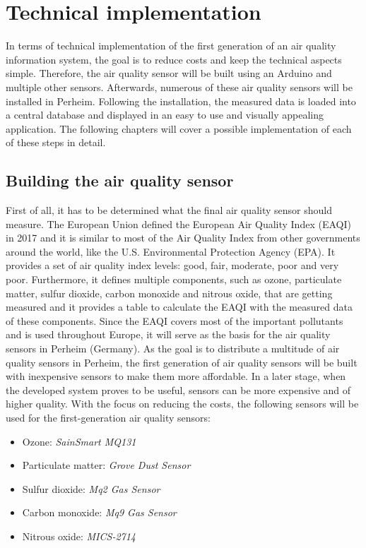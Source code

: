 \documentclass[conference]{IEEEtran}
\begin{document}
\section{Technical implementation} \label{sec:TechnicalImplementation}
In terms of technical implementation of the first generation of an air quality information system, the goal is to reduce costs and keep the technical aspects simple. Therefore, the air quality sensor will be built using an Arduino and multiple other sensors. Afterwards, numerous of these air quality sensors will be installed in Perheim. Following the installation, the measured data is loaded into a central database and displayed in an easy to use and visually appealing application. The following chapters will cover a possible implementation of each of these steps in detail.

\subsection{Building the air quality sensor}
First of all, it has to be determined what the final air quality sensor should measure. The European Union defined the European Air Quality Index (EAQI) in 2017 and it is similar to most of the Air Quality Index from other governments around the world, like the U.S. Environmental Protection Agency (EPA). It provides a set of air quality index levels: good, fair, moderate, poor and very poor. Furthermore, it defines multiple components, such as ozone, particulate matter, sulfur dioxide, carbon monoxide and nitrous oxide, that are getting measured and it provides a table to calculate the EAQI with the measured data of these components. Since the EAQI covers most of the important pollutants and is used throughout Europe, it will serve as the basis for the air quality sensors in Perheim (Germany). As the goal is to distribute a multitude of air quality sensors in Perheim, the first generation of air quality sensors will be built with inexpensive sensors to make them more affordable. In a later stage, when the developed system proves to be useful, sensors can be more expensive and of higher quality. With the focus on reducing the costs, the following sensors will be used for the first-generation air quality sensors:

\begin{itemize}
\item Ozone: \textit{SainSmart MQ131}
\item Particulate matter: \textit{Grove Dust Sensor}
\item Sulfur dioxide: \textit{Mq2 Gas Sensor}
\item Carbon monoxide: \textit{Mq9 Gas Sensor}
\item Nitrous oxide: \textit{MICS-2714}
\end{itemize}
\end{document}
